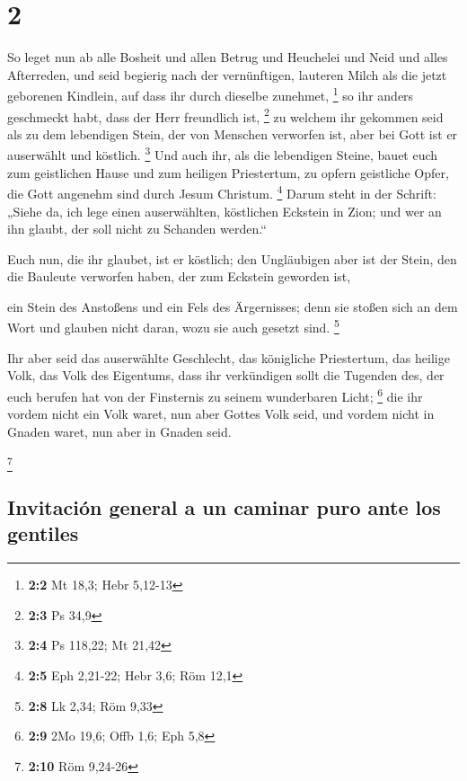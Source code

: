\hypertarget{section-1}{%
\section{2}\label{section-1}}

 So leget nun ab alle Bosheit und allen Betrug und
Heuchelei und Neid und alles Afterreden,  und seid
begierig nach der vernünftigen, lauteren Milch als die jetzt geborenen
Kindlein, auf dass ihr durch dieselbe zunehmet, \footnote{\textbf{2:2}
  Mt 18,3; Hebr 5,12-13}  so ihr anders geschmeckt habt,
dass der Herr freundlich ist, \footnote{\textbf{2:3} Ps 34,9}
 zu welchem ihr gekommen seid als zu dem lebendigen Stein,
der von Menschen verworfen ist, aber bei Gott ist er auserwählt und
köstlich. \footnote{\textbf{2:4} Ps 118,22; Mt 21,42}  Und
auch ihr, als die lebendigen Steine, bauet euch zum geistlichen Hause
und zum heiligen Priestertum, zu opfern geistliche Opfer, die Gott
angenehm sind durch Jesum Christum. \footnote{\textbf{2:5} Eph 2,21-22;
  Hebr 3,6; Röm 12,1}  Darum steht in der Schrift: „Siehe
da, ich lege einen auserwählten, köstlichen Eckstein in Zion; und wer an
ihn glaubt, der soll nicht zu Schanden werden.``

 Euch nun, die ihr glaubet, ist er köstlich; den
Ungläubigen aber ist der Stein, den die Bauleute verworfen haben, der
zum Eckstein geworden ist,

 ein Stein des Anstoßens und ein Fels des Ärgernisses;
denn sie stoßen sich an dem Wort und glauben nicht daran, wozu sie auch
gesetzt sind. \footnote{\textbf{2:8} Lk 2,34; Röm 9,33}

 Ihr aber seid das auserwählte Geschlecht, das königliche
Priestertum, das heilige Volk, das Volk des Eigentums, dass ihr
verkündigen sollt die Tugenden des, der euch berufen hat von der
Finsternis zu seinem wunderbaren Licht; \footnote{\textbf{2:9} 2Mo 19,6;
  Offb 1,6; Eph 5,8}  die ihr vordem nicht ein Volk
waret, nun aber Gottes Volk seid, und vordem nicht in Gnaden waret, nun
aber in Gnaden seid.

\footnote{\textbf{2:10} Röm 9,24-26}

\hypertarget{invitaciuxf3n-general-a-un-caminar-puro-ante-los-gentiles}{%
\subsection{Invitación general a un caminar puro ante los
gentiles}\label{invitaciuxf3n-general-a-un-caminar-puro-ante-los-gentiles}}

